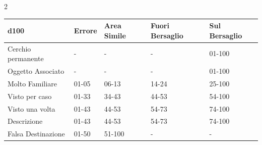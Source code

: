\begin{multicols}{2}
\end{multicols}

\medskip

\noindent\begin{tabularx}{\linewidth}{Xllll}
	\toprule
\rowcolor{gray!20}d100 &Errore&Area Simile&Fuori Bersaglio&Sul Bersaglio\\
\toprule
Cerchio permanente&-&-&-&01-100\\
\rowcolor{gray!20}Oggetto Associato&-&-&-&01-100\\
Molto Familiare&01-05&06-13&14-24&25-100\\
\rowcolor{gray!20}Visto per caso&01-33&34-43&44-53&54-100\\
Visto una volta&01-43&44-53&54-73&74-100\\
\rowcolor{gray!20}Descrizione&01-43&44-53&54-73&74-100\\
Falsa Destinazione&01-50&51-100&-&-
\end{tabularx}

\medskip

